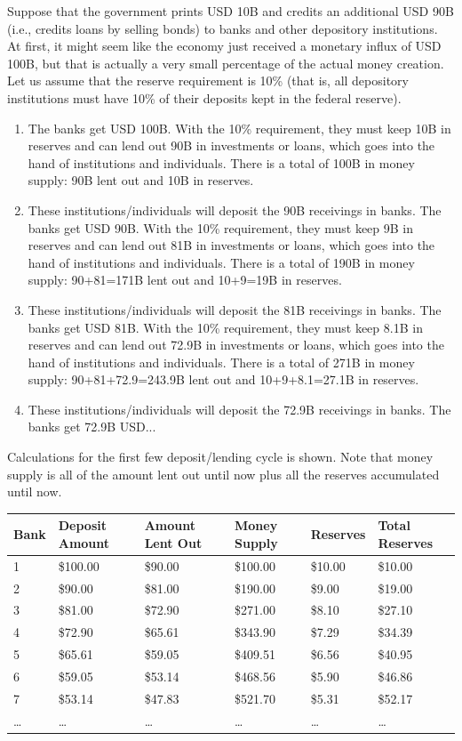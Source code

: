 \documentclass{article}
\begin{document}
      Suppose that the government prints USD 10B and credits an additional USD 90B (i.e., credits loans by selling bonds) to banks and other depository institutions. At first, it might seem like the economy just received a monetary influx of USD 100B, but that is actually a very small percentage of the actual money creation. Let us assume that the reserve requirement is 10\% (that is, all depository institutions must have 10\% of their deposits kept in the federal reserve).

      \begin{enumerate}
        \item The banks get USD 100B. With the 10\% requirement, they must keep 10B in reserves and can lend out 90B in investments or loans, which goes into the hand of institutions and individuals. There is a total of 100B in money supply: 90B lent out and 10B in reserves.
        \item These institutions/individuals will deposit the 90B receivings in banks. The banks get USD 90B. With the 10\% requirement, they must keep 9B in reserves and can lend out 81B in investments or loans, which goes into the hand of institutions and individuals. There is a total of 190B in money supply: 90+81=171B lent out and 10+9=19B in reserves.
        \item These institutions/individuals will deposit the 81B receivings in banks. The banks get USD 81B. With the 10\% requirement, they must keep 8.1B in reserves and can lend out 72.9B in investments or loans, which goes into the hand of institutions and individuals. There is a total of 271B in money supply: 90+81+72.9=243.9B lent out and 10+9+8.1=27.1B in reserves.
        \item These institutions/individuals will deposit the 72.9B receivings in banks. The banks get 72.9B USD...
      \end{enumerate}

      Calculations for the first few deposit/lending cycle is shown. Note that money supply is all of the amount lent out until now plus all the reserves accumulated until now.

      \begin{tabular}{|l|l|l|l|l|l|}
      \hline
      Bank & Deposit Amount & Amount Lent Out & Money Supply & Reserves & Total Reserves \\
      \hline
      1 & \$100.00 & \$90.00 & \$100.00 & \$10.00 & \$10.00 \\
      2 & \$90.00 & \$81.00 & \$190.00 & \$9.00 & \$19.00 \\
      3 & \$81.00 & \$72.90 & \$271.00 & \$8.10 & \$27.10 \\
      4 & \$72.90 & \$65.61 & \$343.90 & \$7.29 & \$34.39 \\
      5 & \$65.61 & \$59.05 & \$409.51 & \$6.56 & \$40.95 \\
      6 & \$59.05 & \$53.14 & \$468.56 & \$5.90 & \$46.86 \\
      7 & \$53.14 & \$47.83 & \$521.70 & \$5.31 & \$52.17 \\
      \ldots & \ldots & \ldots & \ldots & \ldots & \ldots \\
      \hline
      \end{tabular}
\end{document}

